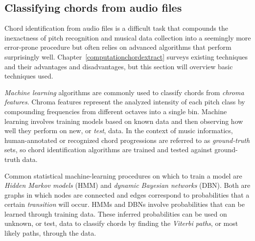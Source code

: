 \subsection{Classifying chords from audio files}

Chord identification from audio files is a difficult task that compounds the inexactness of pitch recognition and musical data collection into a seemingly more error-prone procedure but often relies on advanced algorithms that perform surprisingly well. Chapter~\ref{computationchordextract} surveys existing techniques and their advantages and disadvantages, but this section will overview basic techniques used.

\textit{Machine learning} algorithms are commonly used to classify chords from \textit{chroma features}. Chroma features represent the analyzed intensity of each pitch class by compounding frequencies from different octaves into a single bin. Machine learning involves training models based on known data and then observing how well they perform on new, or \textit{test}, data. In the context of music informatics, human-annotated or recognized chord progressions are referred to as \textit{ground-truth} sets\cite{BurgoyneEtAl_2011_AnExpeGrouSet}, so chord identification algorithms are trained and tested against ground-truth data.

Common statistical machine-learning procedures on which to train a model are \textit{Hidden Markov models} (HMM) and \textit{dynamic Bayesian networks} (DBN). Both are graphs in which nodes are connected and edges correspond to probabilities that a certain \textit{transition} will occur. HMMs and DBNs involve probabilities that can be learned through training data. These inferred probabilities can be used on unknown, or test, data to classify chords by finding the \textit{Viterbi paths}, or most likely paths, through the data.